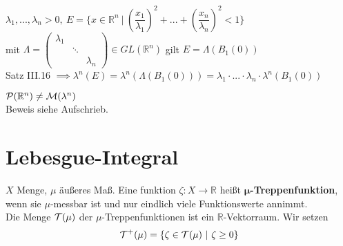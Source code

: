\documentclass[11pt,a4paper,fleqn,openany]{report}
\begin{document}
    \begin{example}
    \begin{minipage}{0.7\textwidth}
      $\lambda_1, ...,  \lambda_n > 0, \ E=\{x \in \mathbb{R}^n \ | \ (\dfrac{x_1}{\lambda_1})^2 + ... + (\dfrac{x_n}{\lambda_n})^2 < 1\}$\\
      mit $\Lambda = \begin{pmatrix}
        \lambda_1 & &\\
        & \ddots &\\
        & & \lambda_n
      \end{pmatrix}
      \in GL(\mathbb{R}^n)$ gilt $E = \Lambda(B_1(0))$\\
      Satz III.16 $\implies \lambda^n(E) = \lambda^n(\Lambda(B_1(0))) = \lambda_1 \cdot ... \cdot \lambda_n \cdot \lambda^n(B_1(0))$
    \end{minipage}\hfill
    \begin{minipage}{0.3\textwidth}
    \end{minipage}
    \end{example}

    \begin{example}[Vitali 1905]
      $\mathcal{P}(\mathbb{R}^n) \neq \mathcal{M}(\lambda^n)$\\
      Beweis siehe Aufschrieb.
    \end{example}

  \chapter{Lebesgue-Integral}
    \begin{definition}
      $X$ Menge, $\mu$ äußeres Maß. Eine funktion $\zeta: X \to \mathbb{R}$ heißt $\bm{\mu}$\textbf{-Treppenfunktion}, wenn sie $\mu$-messbar ist und nur eindlich viele Funktionswerte annimmt.\\
      Die Menge $\mathcal{T}(\mu)$ der $\mu$-Treppenfunktionen ist ein $\mathbb{R}$-Vektorraum. Wir setzen
      \begin{align*}
        \mathcal{T}^+(\mu)=\{\zeta \in \mathcal{T}(\mu) \ | \ \zeta \geq 0\}
      \end{align*}
    \end{definition}
\end{document}
